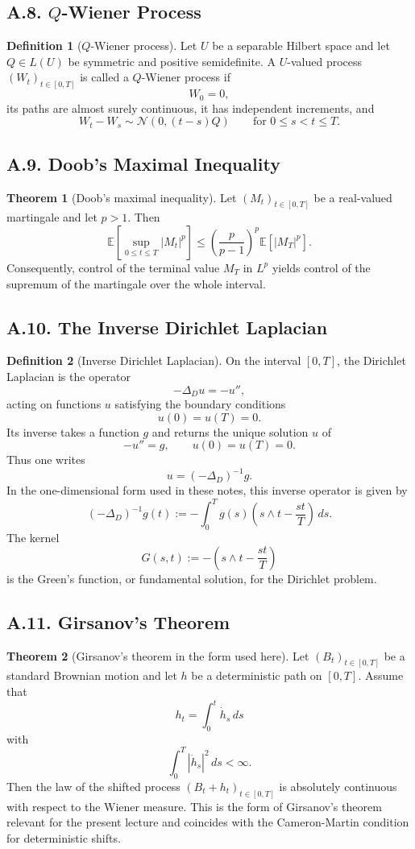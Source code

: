 \documentclass[11pt]{article}
\theoremstyle{definition}
\newtheorem{definition}{Definition}
\newtheorem{theorem}{Theorem}
\theoremstyle{remark}
\begin{document}
\subsection*{A.8. \(Q\)-Wiener Process}
\begin{definition}[\(Q\)-Wiener process]
Let $U$ be a separable Hilbert space and let $Q\in L(U)$ be symmetric and positive semidefinite. A $U$-valued process $(W_t)_{t\in[0,T]}$ is called a \(Q\)-Wiener process if
\[
W_0=0,
\]
its paths are almost surely continuous, it has independent increments, and
\[
W_t-W_s\sim \mathcal N(0,(t-s)Q)
\qquad \text{for } 0\le s<t\le T.
\]
\end{definition}

\subsection*{A.9. Doob's Maximal Inequality}
\begin{theorem}[Doob's maximal inequality]
Let $(M_t)_{t\in[0,T]}$ be a real-valued martingale and let $p>1$. Then
\[
\mathbb E\left[\sup_{0\le t\le T}|M_t|^p\right]
\le
\left(\frac{p}{p-1}\right)^p \mathbb E[|M_T|^p].
\]
Consequently, control of the terminal value \(M_T\) in \(L^p\) yields control of the supremum of the martingale over the whole interval.
\end{theorem}

\subsection*{A.10. The Inverse Dirichlet Laplacian}
\begin{definition}[Inverse Dirichlet Laplacian]
On the interval \([0,T]\), the Dirichlet Laplacian is the operator
\[
-\Delta_D u=-u'',
\]
acting on functions \(u\) satisfying the boundary conditions
\[
u(0)=u(T)=0.
\]
Its inverse takes a function \(g\) and returns the unique solution \(u\) of
\[
-u''=g,
\qquad
u(0)=u(T)=0.
\]
Thus one writes
\[
u=(-\Delta_D)^{-1}g.
\]
In the one-dimensional form used in these notes, this inverse operator is given by
\[
(-\Delta_D)^{-1}g(t):=-\int_0^T g(s)\left(s\wedge t-\frac{st}{T}\right)\,ds.
\]
The kernel
\[
G(s,t):= -\left(s\wedge t-\frac{st}{T}\right)
\]
is the Green's function, or fundamental solution, for the Dirichlet problem.
\end{definition}

\subsection*{A.11. Girsanov's Theorem}
\begin{theorem}[Girsanov's theorem in the form used here]
Let $(B_t)_{t\in[0,T]}$ be a standard Brownian motion and let $h$ be a deterministic path on $[0,T]$. Assume that
\[
h_t=\int_0^t \dot h_s\,ds
\]
with
\[
\int_0^T |\dot h_s|^2\,ds<\infty.
\]
Then the law of the shifted process $(B_t+h_t)_{t\in[0,T]}$ is absolutely continuous with respect to the Wiener measure. This is the form of Girsanov's theorem relevant for the present lecture and coincides with the Cameron-Martin condition for deterministic shifts.
\end{theorem}
\end{document}

